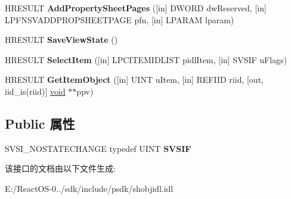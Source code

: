 \begin{DoxyCompactItemize}
\item 
\mbox{\label{interface_i_shell_view_adb1a60152c8bdf86d4c13d76420bc531}} 
H\+R\+E\+S\+U\+LT {\bfseries Add\+Property\+Sheet\+Pages} (\mbox{[}in\mbox{]} D\+W\+O\+RD dw\+Reserved, \mbox{[}in\mbox{]} L\+P\+F\+N\+S\+V\+A\+D\+D\+P\+R\+O\+P\+S\+H\+E\+E\+T\+P\+A\+GE pfn, \mbox{[}in\mbox{]} L\+P\+A\+R\+AM lparam)
\item 
\mbox{\label{interface_i_shell_view_a9ee664ef41818441e2266e3e25692ee1}} 
H\+R\+E\+S\+U\+LT {\bfseries Save\+View\+State} ()
\item 
\mbox{\label{interface_i_shell_view_ac2dec13322b39906596ed1ad310f8c50}} 
H\+R\+E\+S\+U\+LT {\bfseries Select\+Item} (\mbox{[}in\mbox{]} L\+P\+C\+I\+T\+E\+M\+I\+D\+L\+I\+ST pidl\+Item, \mbox{[}in\mbox{]} S\+V\+S\+IF u\+Flags)
\item 
\mbox{\label{interface_i_shell_view_ae03105ce1b5e08b0035acf4d4fd034f4}} 
H\+R\+E\+S\+U\+LT {\bfseries Get\+Item\+Object} (\mbox{[}in\mbox{]} U\+I\+NT u\+Item, \mbox{[}in\mbox{]} R\+E\+F\+I\+ID riid, \mbox{[}out, iid\+\_\+is(riid)\mbox{]} \hyperlink{interfacevoid}{void} $\ast$$\ast$ppv)
\end{DoxyCompactItemize}
\subsection*{Public 属性}
\begin{DoxyCompactItemize}
\item 
\mbox{\label{interface_i_shell_view_ae5810294a7e1b04479a8237ff35bc8a6}} 
S\+V\+S\+I\+\_\+\+N\+O\+S\+T\+A\+T\+E\+C\+H\+A\+N\+GE typedef U\+I\+NT {\bfseries S\+V\+S\+IF}
\end{DoxyCompactItemize}


该接口的文档由以下文件生成\+:\begin{DoxyCompactItemize}
\item 
E\+:/\+React\+O\+S-\/0../sdk/include/psdk/shobjidl.\+idl\end{DoxyCompactItemize}
